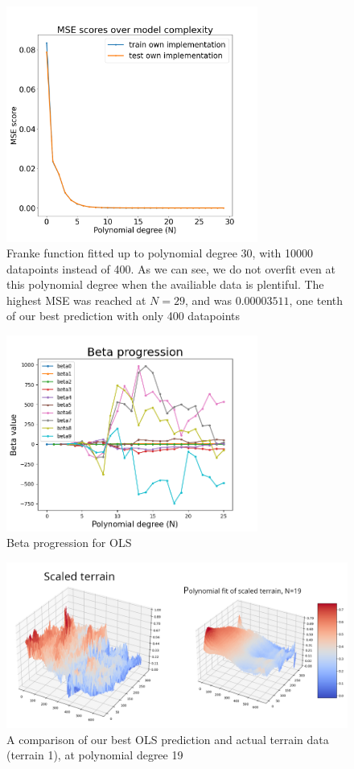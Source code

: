 \documentclass[twocolumn,10pt,cleanfoot]{asme2ej}
\begin{document}
\begin{figure}
\centerline{\includegraphics[width=3.25in]{figure/frankiehigherdatapoints.png}}
\caption{Franke function fitted up to polynomial degree 30, with 10000 datapoints instead of 400. As we can see, we do not overfit even at this polynomial degree when the availiable data is plentiful. The highest MSE was reached at $N=29$, and was $0.00003511$, one tenth of our best prediction with only 400 datapoints}
\label{frankiehigherdatapoints}
\end{figure}

\begin{figure}
\centerline{\includegraphics[width=3.25in]{figure/frankenoisybeta.png}}
\caption{Beta progression for OLS}
\label{frankenoisybeta}
\end{figure}

\begin{figure} 
\centerline{\includegraphics[width=6.85in]{figure/real1surfacecomp.png}}
\caption{A comparison of our best OLS prediction and actual terrain data (terrain 1), at polynomial degree 19}
\label{real1surfacecomp}
\end{figure}
\end{document}
